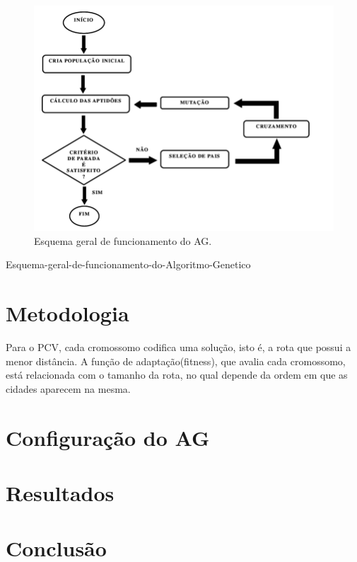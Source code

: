 \documentclass[
article,			%
11pt,				%
oneside,			%
a4paper,			%
english,			%
brazil,				%
sumario=tradicional
]{article}
\begin{document}
	\begin{figure}[H]
		\centering
		\includegraphics[width=1\textwidth]{Figuras/funcionamento-ag.png}
		\caption{Esquema geral de funcionamento do AG.}
	\end{figure}
	
	Esquema-geral-de-funcionamento-do-Algoritmo-Genetico
	
	\section{Metodologia}
	
	Para o PCV, cada cromossomo codifica uma solução, isto é, a rota que possui a menor distância. A função de
	adaptação(fitness), que avalia cada cromossomo, está relacionada com o tamanho da rota, no qual depende da ordem em que as cidades aparecem na mesma.
	
	
	\section{Configuração do AG}
	


	\section{Resultados}

	
	\section{Conclusão}
	
\end{document}
